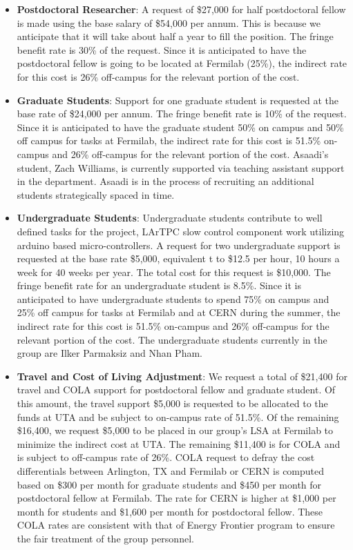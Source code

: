 \begin{enumerate}
\begin{itemize}[noitemsep,nolistsep]
\item {{\bf Postdoctoral Researcher}: A request of \$27,000 for half postdoctoral fellow is made using the base salary of \$54,000 per annum. This is because we anticipate that it will take about half a year to fill the position.  The fringe benefit rate is 30\% of the request.  Since it is anticipated to have the postdoctoral fellow is going to be located at Fermilab (25\%), the indirect rate for this cost is 26\% off-campus for the relevant portion of the cost.} 

\item{{\bf Graduate Students}: Support for one graduate student is requested at the base rate of \$24,000 per annum.   The fringe benefit rate is 10\% of the request.  Since it is anticipated to have the graduate student 50\% on campus and 50\% off campus for tasks at Fermilab, the indirect rate for this cost is 51.5\% on-campus and 26\% off-campus for the relevant portion of the cost.   Asaadi’s student, Zach Williams, is currently supported via teaching assistant support in the department.   Asaadi is in the process of recruiting an additional students strategically spaced in time.}

\item {{\bf Undergraduate Students}: Undergraduate students contribute to well defined tasks for the project, LArTPC slow control component work utilizing arduino based micro-controllers.  A request for two undergraduate support is requested at the base rate \$5,000, equivalent t to \$12.5 per hour, 10 hours a week for 40 weeks per year.  The total cost for this request is \$10,000.  The fringe benefit rate for an undergraduate student is 8.5\%.  Since it is anticipated to have undergraduate students to spend 75\% on campus and 25\% off campus for tasks at Fermilab and at CERN during the summer, the indirect rate for this cost is 51.5\% on-campus and 26\% off-campus for the relevant portion of the cost.   The undergraduate students currently in the group are Ilker Parmaksiz and Nhan Pham.}

\item{{\bf Travel and Cost of Living Adjustment}: We request a total of \$21,400 for travel and COLA support for postdoctoral fellow and graduate student.   Of this amount, the travel support \$5,000 is requested to be allocated to the funds at UTA and be subject to on-campus rate of 51.5\%.  Of the remaining \$16,400, we request \$5,000 to be placed in our group’s LSA at Fermilab to minimize the indirect cost at UTA.   The remaining \$11,400 is for COLA and is subject to off-campus rate of 26\%.  COLA request to defray the cost differentials between Arlington, TX and Fermilab or CERN is computed based on \$300 per month for graduate students and \$450 per month for postdoctoral fellow at Fermilab.  The rate for CERN is higher at \$1,000 per month for students and \$1,600 per month for postdoctoral fellow.  These COLA rates are consistent with that of Energy Frontier program to ensure the fair treatment of the group personnel.}


\end{itemize}
\end{enumerate}
